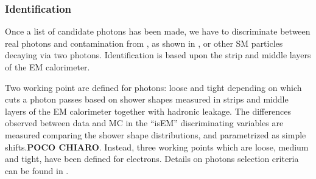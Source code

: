 \subsubsection{Identification}
Once a list of candidate photons has been made, we have to discriminate between real photons and contamination from \pizero, as shown in \Fig{\ref{pizerogamma}}, or other SM particles decaying via two photons. Identification is based upon the strip and middle layers of the EM calorimeter.

Two working point are defined for photons: loose and tight depending on which cuts a photon passes based on shower shapes measured in strips and middle layers of the EM calorimeter together with hadronic leakage. The differences observed between data and MC in the ``isEM'' discriminating variables are measured comparing the shower shape distributions, and parametrized as simple shifts.{\bfseries POCO CHIARO}. Instead, three working points which are loose, medium and tight, have been defined for electrons. Details on photons selection criteria can be found in \cite[Sect. 4]{photons}.

